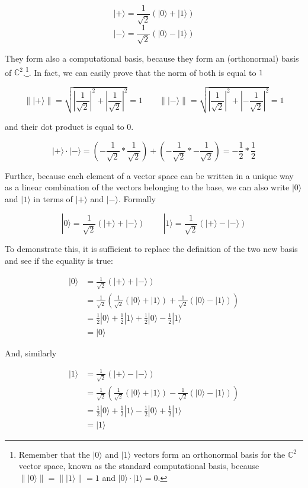 \documentclass[a4paper,10pt]{article}
\newcommand\norm[1]{\left\lVert#1\right\rVert}
\begin{document}
$$|+\rangle = \frac{1}{\sqrt{2}}(|0\rangle + |1\rangle)$$ 
$$|-\rangle = \frac{1}{\sqrt{2}}(|0\rangle - |1\rangle)$$

They form also a computational basis, because they form an (orthonormal) basis of ${\mathbb{C}}^2$.\footnote{Remember that the $|0\rangle$ and $|1\rangle$ vectors form an orthonormal basis for the ${\mathbb{C}}^2$ vector space, known as the standard computational basis, because $\norm{|0\rangle} = \norm{|1\rangle} = 1$ and $|0\rangle \cdot |1\rangle = 0$.}. In fact, we can easily prove that the norm of both is equal to $1$

$$\norm{|+\rangle} = \sqrt{\left|\frac{1}{\sqrt{2}}\right|^2 + \left|\frac{1}{\sqrt{2}}\right|^2} = 1 \; \; \; \; \; \; \; 
\norm{|-\rangle} = \sqrt{\left|\frac{1}{\sqrt{2}}\right|^2 + \left|-\frac{1}{\sqrt{2}}\right|^2} = 1$$

and their dot product is equal to $0$.

$$|+\rangle \cdot |-\rangle = \left(-\frac{1}{\sqrt{2}} * \frac{1}{\sqrt{2}}\right) + \left(-\frac{1}{\sqrt{2}} * -\frac{1}{\sqrt{2}}\right) = -\frac{1}{2} * \frac{1}{2}$$

Further, because each element of a vector space can be written in a unique way as a linear combination of the vectors belonging to the base, we can also write $|0\rangle$ and $|1\rangle$ in terms of $|+\rangle$ and $|-\rangle$. Formally

$$|0\rangle = \frac{1}{\sqrt{2}}(|+\rangle + |-\rangle) \; \; \; \; \; \; \; \; |1\rangle = \frac{1}{\sqrt{2}}(|+\rangle - |-\rangle)$$

To demonstrate this, it is sufficient to replace the definition of the two new basis and see if the equality is true:

\begin{equation*}
\begin{split}
|0\rangle & = \frac{1}{\sqrt{2}}(|+\rangle + |-\rangle) \\
 & = \frac{1}{\sqrt{2}}(\frac{1}{\sqrt{2}}(|0\rangle + |1\rangle) + \frac{1}{\sqrt{2}}(|0\rangle - |1\rangle)) \\
 & = \frac{1}{2}|0\rangle + \frac{1}{2}|1\rangle + \frac{1}{2}|0\rangle - \frac{1}{2}|1\rangle \\
 & = |0\rangle
\end{split}
\end{equation*}

And, similarly

\begin{equation*}
\begin{split}
|1\rangle & = \frac{1}{\sqrt{2}}(|+\rangle - |-\rangle) \\
 & = \frac{1}{\sqrt{2}}(\frac{1}{\sqrt{2}}(|0\rangle + |1\rangle) - \frac{1}{\sqrt{2}}(|0\rangle - |1\rangle)) \\
 & = \frac{1}{2}|0\rangle + \frac{1}{2}|1\rangle - \frac{1}{2}|0\rangle + \frac{1}{2}|1\rangle \\
 & = |1\rangle
\end{split}
\end{equation*}
\end{document}
